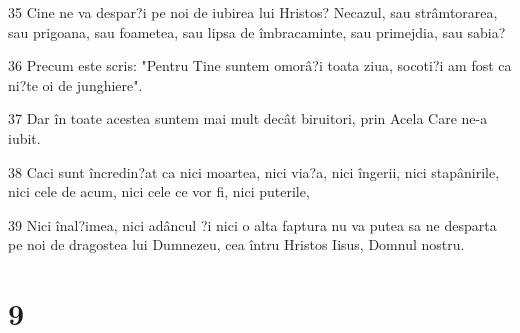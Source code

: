 \par 35 Cine ne va despar?i pe noi de iubirea lui Hristos? Necazul, sau strâmtorarea, sau prigoana, sau foametea, sau lipsa de îmbracaminte, sau primejdia, sau sabia?
\par 36 Precum este scris: "Pentru Tine suntem omorâ?i toata ziua, socoti?i am fost ca ni?te oi de junghiere".
\par 37 Dar în toate acestea suntem mai mult decât biruitori, prin Acela Care ne-a iubit.
\par 38 Caci sunt încredin?at ca nici moartea, nici via?a, nici îngerii, nici stapânirile, nici cele de acum, nici cele ce vor fi, nici puterile,
\par 39 Nici înal?imea, nici adâncul ?i nici o alta faptura nu va putea sa ne desparta pe noi de dragostea lui Dumnezeu, cea întru Hristos Iisus, Domnul nostru.

\chapter{9}

